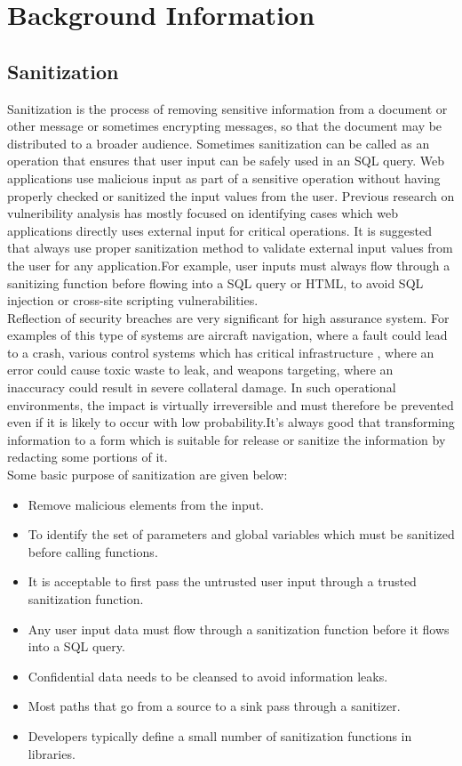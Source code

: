 \chapter{Background Information}

\section{Sanitization}
Sanitization is the process of removing sensitive information from a document or other message or sometimes encrypting messages, so that the document may be distributed to a broader audience. Sometimes sanitization can be called as an operation that ensures that user input can be safely used in an SQL query. Web applications use malicious input as part of a sensitive operation without having properly checked or sanitized the input values from the user. Previous research on vulneribility analysis has mostly focused on identifying cases which web applications directly uses external input for critical operations. It is suggested that always use proper sanitization method to validate external input values from the user for any application.For example, user inputs must always flow through a sanitizing function before flowing into a SQL query or HTML, to avoid SQL injection or cross-site scripting vulnerabilities.\\

Reflection of security breaches are very significant for high assurance system. For examples of this type of systems are aircraft navigation, where a fault could lead to a crash, various control systems which has critical infrastructure , where an error 
could cause toxic waste to leak, and weapons targeting, where an inaccuracy could result in severe collateral damage. In such
operational environments, the impact is virtually irreversible and must therefore be prevented even if it is likely to occur
with low probability.It's always good that transforming information to a form which is suitable for release or sanitize the information by redacting some portions of it.\\

Some basic purpose of sanitization are given below:
\begin{itemize}
	\item Remove malicious elements from the input.
	\item To identify the set of parameters and global variables which must be sanitized before calling functions.
	\item It is acceptable to first pass the untrusted user input through a trusted sanitization function.	
	\item Any user input data must flow through a sanitization function before it flows into a SQL query.
	\item Confidential data needs to be cleansed to avoid information leaks.
	\item Most paths that go from a source to a sink pass through a sanitizer.
	\item Developers typically define a small number of sanitization functions in libraries.
\end{itemize}

